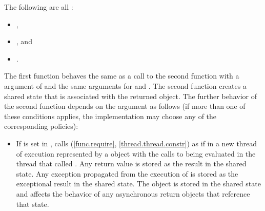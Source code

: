 \begin{itemdescr}
\pnum
\mandates
The following are all :
\begin{itemize}
\item {},
\item {}, and
\item {}.
\end{itemize}

\pnum
\effects
The first function
behaves the same as a call to the second function with a  argument of
and the same arguments for  and .
The second function creates a shared state that is associated with
the returned  object.
The further behavior
of the second function depends on the  argument as follows (if
more than one of these conditions applies, the implementation may choose any of
the corresponding policies):

\begin{itemize}
\item
If  is set in , calls
(\ref{func.require}, \ref{thread.thread.constr})
as if in a new thread of execution represented by a  object
with the calls to  being evaluated in the thread that called .
Any return value
is stored as the result in the
shared state. Any exception propagated from
the execution of
is stored as the exceptional result in the shared state.
The  object is
stored in the shared state
and affects the behavior of any asynchronous return objects that
reference that state.


\end{itemize}
\end{itemdescr}
